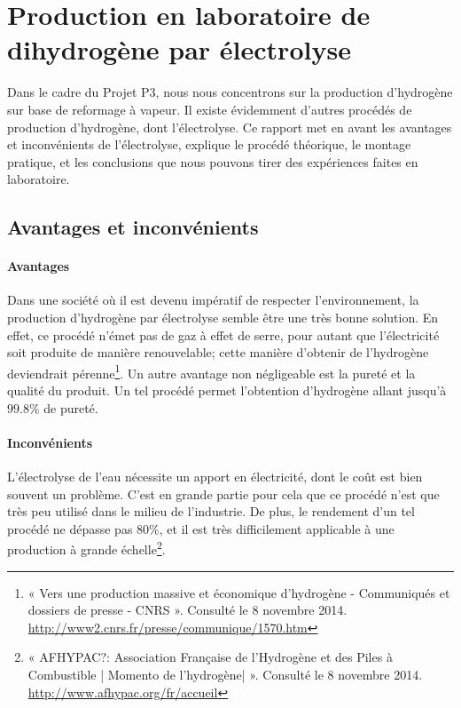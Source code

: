 \section{Production en laboratoire de dihydrogène par électrolyse}

Dans le cadre du Projet P3, nous nous concentrons sur la production d'hydrogène sur base de reformage à vapeur.
Il existe évidemment d'autres procédés de production d'hydrogène, dont l'électrolyse. Ce rapport met en avant les
avantages et inconvénients de l'électrolyse, explique le procédé théorique, le montage pratique, et les conclusions 
que nous pouvons tirer des expériences faites en laboratoire.

\subsection{Avantages et inconvénients}

\paragraph{Avantages} Dans une société où il est devenu impératif de respecter l'environnement, la production 
d'hydrogène par électrolyse semble être une très bonne solution. En effet, ce procédé n'émet pas de gaz à effet de
serre, pour autant que l'électricité soit produite de manière renouvelable; cette manière d'obtenir de l'hydrogène 
deviendrait pérenne\footnote{« Vers une production massive et économique d’hydrogène - Communiqués et dossiers de 
presse - CNRS ». Consulté le 8 novembre 2014. \url{http://www2.cnrs.fr/presse/communique/1570.htm}}. Un autre avantage non 
négligeable est la pureté et la qualité du produit. Un tel procédé permet l'obtention d'hydrogène allant jusqu'à
$99.8 \%$ de pureté.

\paragraph{Inconvénients} L'électrolyse de l'eau nécessite un apport en électricité, dont le coût est bien souvent 
un problème. C'est en grande partie pour cela que ce procédé n'est que très peu utilisé dans le milieu de l'industrie. 
De plus, le rendement d'un tel procédé ne dépasse pas $80 \%$, et il est très difficilement applicable à une production 
à grande échelle\footnote{« AFHYPAC?: Association Française de l’Hydrogène et des Piles à Combustible | Momento de 
l'hydrogène| ». Consulté le 8 novembre 2014. \url{http://www.afhypac.org/fr/accueil}}.

